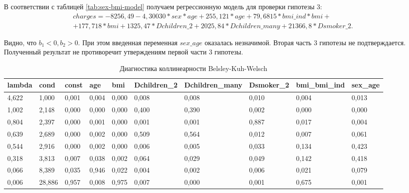 \documentclass[a4paper,12pt]{article}
\begin{document}
В соответствии с таблицей \ref{tab:sex-bmi-model} получаем регрессионную модель для проверки гипотезы 3:
\begin{align*}
charges = -8256,49 - 4,30030 * sex * age + 255,121 * age + 79,6815 * bmi\_ind * bmi + \\ + 177,718 * bmi + 1325,47 * Dchildren\_2 + 2025,84 * Dchildren\_many + 21366,8 * Dsmoker\_2.
\end{align*}

Видно, что $b_1 < 0, b_2 > 0$. При этом введенная переменная $sex\_age$ оказалась незначимой. Вторая часть 3 гипотезы не подтверждается. Полученный результат не противоречит утверждениям первой части 3 гипотезы.

\begin{table}[H]
	\begin{adjustbox}{width=\linewidth}
	\begin{tabular}{|l|l|l|l|l|l|l|l|l|l|}
		\hline
		lambda & cond   & const & age   & bmi   & Dchildren\_2 & Dchildren\_many & Dsmoker\_2 & bmi\_bmi\_ind & sex\_age \\ \hline
		4,622  & 1,000  & 0,001 & 0,004 & 0,000 & 0,008        & 0,008           & 0,010      & 0,004         & 0,013    \\ \hline
		1,002  & 2,148  & 0,000 & 0,000 & 0,000 & 0,400        & 0,390           & 0,002      & 0,000         & 0,000    \\ \hline
		0,804  & 2,397  & 0,000 & 0,001 & 0,000 & 0,001        & 0,001           & 0,887      & 0,017         & 0,004    \\ \hline
		0,639  & 2,689  & 0,000 & 0,002 & 0,000 & 0,509        & 0,564           & 0,012      & 0,007         & 0,061    \\ \hline
		0,544  & 2,916  & 0,000 & 0,002 & 0,000 & 0,006        & 0,005           & 0,033      & 0,134         & 0,423    \\ \hline
		0,318  & 3,813  & 0,007 & 0,038 & 0,002 & 0,064        & 0,029           & 0,049      & 0,142         & 0,418    \\ \hline
		0,066  & 8,389  & 0,035 & 0,946 & 0,022 & 0,004        & 0,002           & 0,006      & 0,021         & 0,079    \\ \hline
		0,006  & 28,886 & 0,957 & 0,008 & 0,975 & 0,007        & 0,000           & 0,001      & 0,675         & 0,001    \\ \hline
	\end{tabular}
\end{adjustbox}
\caption{Диагностика коллинеарности Belsley-Kuh-Welsch}
\label{tab:sex-bmi-model_bkw}
\end{table}
\end{document}
